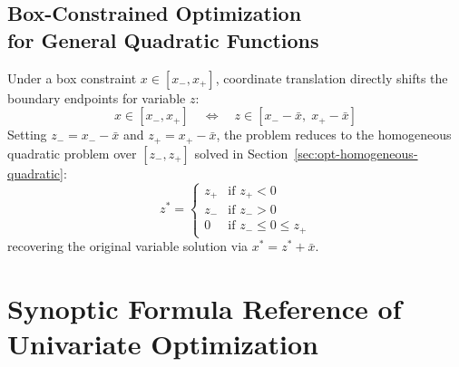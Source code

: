 \subsection[Box-Constrained General Quadratic Optimization]{Box-Constrained Optimization\\ for General Quadratic Functions}
Under a box constraint $x \in [x_-, x_+]$, coordinate translation directly shifts the boundary endpoints for variable $z$:
\begin{equation}
x \in [x_-, x_+] \quad \Longleftrightarrow \quad z \in [x_- - \bar{x}, \; x_+ - \bar{x}]
\end{equation}
Setting $z_- = x_- - \bar{x}$ and $z_+ = x_+ - \bar{x}$, the problem reduces to the homogeneous quadratic problem over $[z_-, z_+]$ solved in Section~\ref{sec:opt-homogeneous-quadratic}:
\begin{equation}
z^* = \begin{cases}
z_+ & \text{if } z_+ < 0 \\
z_- & \text{if } z_- > 0 \\
0 & \text{if } z_- \le 0 \le z_+
\end{cases}
\end{equation}
recovering the original variable solution via $x^* = z^* + \bar{x}$.


\FloatBarrier
\section{Synoptic Formula Reference of Univariate Optimization}
\label{sec:opt-synoptic-reference}

